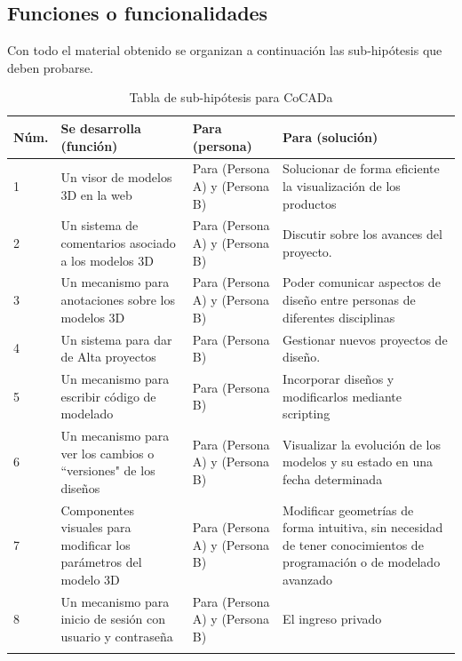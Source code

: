 \subsection{Funciones o funcionalidades}
\label{section:subhipo}
Con todo el material obtenido se organizan a continuación las sub-hipótesis que deben probarse. 

\begin{longtable}{|p{1cm}|p{4cm}|p{4cm}|p{4cm}| }

\hline
    Núm. & Se desarrolla (función) & Para (persona)  & Para (solución)\\
\hline
1 & Un visor de modelos 3D en la web & Para (Persona A) y  (Persona B) & Solucionar de forma eficiente la visualización de los productos \\

\hline
2 & Un sistema de comentarios asociado a los modelos 3D & Para (Persona A) y (Persona B)  & Discutir sobre los avances del proyecto.
\\

\hline
3 & Un mecanismo para anotaciones sobre los modelos 3D & Para (Persona A)  y (Persona B) & 
Poder comunicar aspectos de diseño entre personas de diferentes disciplinas  \\

\hline
4 & Un sistema para dar de Alta proyectos & Para (Persona B) & Gestionar nuevos proyectos de diseño.
\\

\hline
5 & Un mecanismo para escribir código de modelado & Para (Persona B) & Incorporar diseños y modificarlos mediante scripting \\
\hline
6 & Un mecanismo para ver los cambios o ``versiones" de los diseños & Para (Persona A) y (Persona B) & Visualizar la evolución de los modelos y su estado en una fecha determinada  \\
\hline

7 & Componentes visuales para modificar los parámetros del modelo 3D & Para (Persona A) y (Persona B) & Modificar geometrías de forma intuitiva, sin necesidad de tener conocimientos de programación o de modelado avanzado  \\

\hline
8 & Un mecanismo para inicio de sesión con usuario y contraseña & Para (Persona A) y (Persona B) & El ingreso privado  \\
\hline

\caption{\footnotesize{Tabla de sub-hipótesis para CoCADa}}

\end{longtable}


